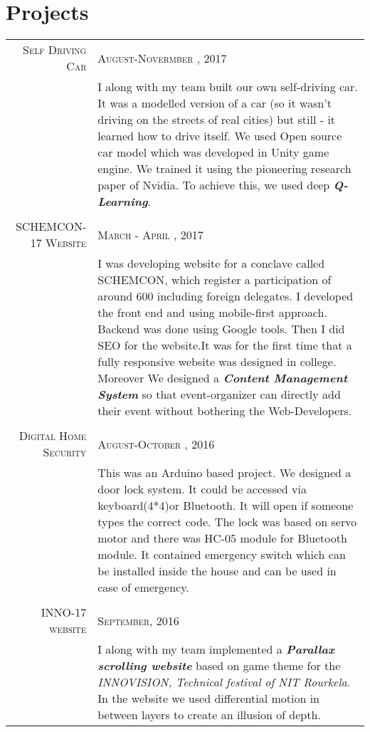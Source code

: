 \documentclass[a4paper,10pt]{article}
\begin{document}
\section{Projects}
    \begin{tabular}{r|p{11cm}}
    
        \textsc{Self Driving Car}&\textsc{August-Novermber , 2017}\\ &\footnotesize{I along with my team built our own self-driving car. It was a modelled version of a car (so it wasn't driving on the streets of real cities) but still - it learned how to drive itself. We used Open source car model which was developed in Unity game engine. We trained it using the pioneering research paper of Nvidia. To achieve this, we used deep \textit{\textbf{Q-Learning}}.}\\ \\
        
        \textsc{SCHEMCON-17 Website}&\textsc{March - April , 2017}\\ &\footnotesize{I was developing website for a conclave called SCHEMCON, which register a participation
        of around 600 including foreign delegates. I developed the front end and using mobile-first approach. Backend was done using Google tools. Then I did SEO for the
        website.It was for the first time that a fully responsive website was designed in college. Moreover We designed a \textit{\textbf{Content Management System}} so that event-organizer can directly add their event without bothering the Web-Developers.}\\ \\
        
        \textsc{Digital Home Security}&\textsc{August-October , 2016}\\ &\footnotesize{This was an Arduino based project. We designed a door lock system. It could be accessed via keyboard(4*4)or Bluetooth. It will open if someone types the correct code. The lock was based on servo motor and there was HC-05 module for Bluetooth module. It contained emergency switch which can be installed inside the house and can be used in case of emergency.}\\ \\
        \textsc{INNO-17 website}&\textsc{ September, 2016}\\ &\footnotesize{I along with my team implemented a \textit{\textbf{Parallax scrolling website}} based on
        game theme for the \textit{INNOVISION, Technical festival of NIT Rourkela}. In the website we used differential motion in between layers to create an illusion of depth. }
    \end{tabular}
\end{document}
